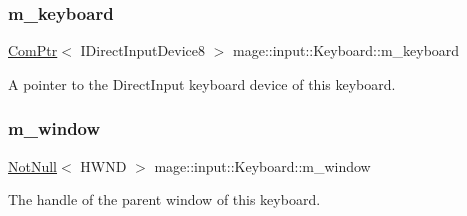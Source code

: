 \subsubsection{\texorpdfstring{m\+\_\+keyboard}{m\_keyboard}}
{\footnotesize\ttfamily \mbox{\hyperlink{namespacemage_ae74f374780900893caa5555d1031fd79}{Com\+Ptr}}$<$ I\+Direct\+Input\+Device8 $>$ mage\+::input\+::\+Keyboard\+::m\+\_\+keyboard\hspace{0.3cm}{\ttfamily [private]}}

A pointer to the Direct\+Input keyboard device of this keyboard. \mbox{\label{classmage_1_1input_1_1_keyboard_ac8074d4690146bf6523c236a7af50353}} 
\subsubsection{\texorpdfstring{m\+\_\+window}{m\_window}}
{\footnotesize\ttfamily \mbox{\hyperlink{namespacemage_a8769f9d670d6b585ea306cb1062af94b}{Not\+Null}}$<$ H\+W\+ND $>$ mage\+::input\+::\+Keyboard\+::m\+\_\+window\hspace{0.3cm}{\ttfamily [private]}}

The handle of the parent window of this keyboard. 